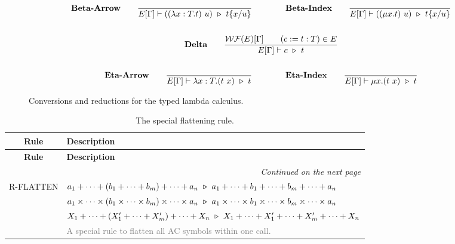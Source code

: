 \documentclass{article}
\begin{document}
\begin{figure}[h]
    \begin{gather*}
        \textbf{Beta-Arrow} \qquad
        \frac{}{E[\Gamma] \vdash ((\lambda x : T.t)\ u)\ \reduce\ t\{x/u\}} 
        \qquad \qquad
        \textbf{Beta-Index} \qquad
        \frac{}{E[\Gamma] \vdash ((\mu x.t)\ u)\ \reduce\ t\{x/u\}} 
        \\
        \\
        \textbf{Delta} \qquad
        \frac{\WF(E)[\Gamma] \qquad (c:=t:T) \in E}{E[\Gamma] \vdash c\ \reduce\ t} \\
        \\
        \textbf{Eta-Arrow} \qquad
        \frac{}{E[\Gamma] \vdash \lambda x : T . (t\ x)\ \reduce\ t}
        \qquad \qquad
        \textbf{Eta-Index} \qquad
        \frac{}{E[\Gamma] \vdash \mu x . (t\ x)\ \reduce\ t}
    \end{gather*}
    \caption{Conversions and reductions for the typed lambda calculus.}
\end{figure}

\newenvironment{ruletable}[1]
{
    \begin{longtable}{cl}
    \caption{#1}\\
    \hline
    \textbf{Rule} & \textbf{Description} \\
    \hline
    \endfirsthead

    \hline
    \textbf{Rule} & \textbf{Description} \\
    \hline
    \endhead

    \hline
    \multicolumn{2}{r}{\textit{Continued on the next page}} \\
    \hline
    \endfoot

    \hline
    \endlastfoot
}
{
    \end{longtable}
}

\renewcommand{\arraystretch}{1.2} %

\begin{ruletable}{The special flattening rule.}
    R-FLATTEN
    & $a_1 + \cdots + (b_1 + \cdots + b_m) + \cdots + a_n\ \triangleright\ a_1 + \cdots + b_1 + \cdots + b_m + \cdots + a_n$ \\
    & $a_1 \times \cdots \times (b_1 \times \cdots \times b_m) \times \cdots \times a_n\ \reduce\ a_1 \times \cdots \times b_1 \times \cdots \times b_m \times \cdots \times a_n$ \\
    & $X_1 + \cdots + (X_1' + \cdots + X_m') + \cdots + X_n\ \triangleright\ X_1 + \cdots + X_1' + \cdots + X_m' + \cdots + X_n$ \\
    & \textcolor{gray}{A special rule to flatten all AC symbols within one call.}    
\end{ruletable}
\end{document}
